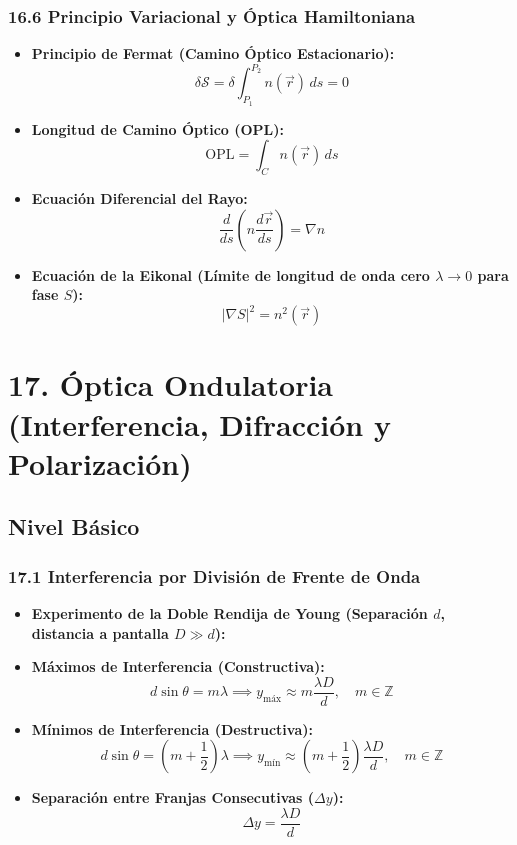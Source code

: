\documentclass[11pt,a4paper]{article}
\begin{document}
\subsubsection*{16.6 Principio Variacional y Óptica Hamiltoniana}

\begin{itemize}
  \item \textbf{Principio de Fermat (Camino Óptico Estacionario):}
  \[
    \delta \mathcal{S} = \delta \int_{P_1}^{P_2} n(\vec{r}) \, ds = 0
  \]
  \item \textbf{Longitud de Camino Óptico (OPL):}
  \[
    \text{OPL} = \int_C n(\vec{r}) \, ds
  \]
  \item \textbf{Ecuación Diferencial del Rayo:}
  \[
    \frac{d}{ds}\left( n \frac{d\vec{r}}{ds} \right) = \nabla n
  \]
  \item \textbf{Ecuación de la Eikonal (Límite de longitud de onda cero $\lambda \to 0$ para fase $S$):}
  \[
    |\nabla S|^2 = n^2(\vec{r})
  \]
\end{itemize}

\section*{17. Óptica Ondulatoria (Interferencia, Difracción y Polarización)}

\subsection*{Nivel Básico}

\subsubsection*{17.1 Interferencia por División de Frente de Onda}

\begin{itemize}
  \item \textbf{Experimento de la Doble Rendija de Young (Separación $d$, distancia a pantalla $D \gg d$):}
  \item \textbf{Máximos de Interferencia (Constructiva):}
  \[
    d \sin\theta = m \lambda \implies y_{\text{máx}} \approx m \frac{\lambda D}{d}, \quad m \in \mathbb{Z}
  \]
  \item \textbf{Mínimos de Interferencia (Destructiva):}
  \[
    d \sin\theta = \left( m + \frac{1}{2} \right)\lambda \implies y_{\text{mín}} \approx \left( m + \frac{1}{2} \right)\frac{\lambda D}{d}, \quad m \in \mathbb{Z}
  \]
  \item \textbf{Separación entre Franjas Consecutivas ($\Delta y$):}
  \[
    \Delta y = \frac{\lambda D}{d}
  \]
\end{itemize}
\end{document}
